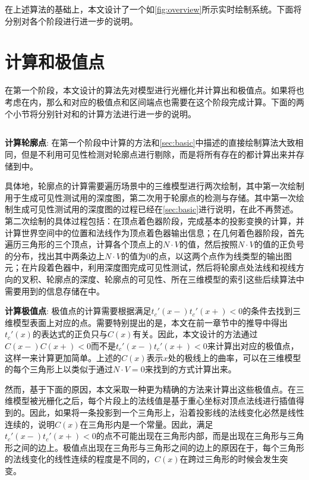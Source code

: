 {在上述算法的基础上，本文设计了一个如\autoref{fig:overview}所示实时绘制系统。下面将分别对各个阶段进行进一步的说明。

\section{计算\conp{}和极值点}

在第一个阶段，本文设计的算法先对模型进行光栅化并计算出\conp{}和极值点。如果将\scon{}也考虑在内，那么\sconp{}和对应的极值点和区间端点也需要在这个阶段完成计算。下面的两个小节将分别针对\con{}和\scon{}的计算方法进行进一步的说明。

\subsection{\con{}}

\textbf{计算轮廓点}: 在第一个阶段中计算\conp{}的方法和\autoref{sec:basic}中描述的直接绘制算法大致相同，但是不利用可见性检测对轮廓点进行剔除，而是将所有存在的\conp{}都计算出来并存储到\ppll{}中。

具体地，轮廓点的计算需要遍历场景中的三维模型进行两次绘制，其中第一次绘制用于生成可见性测试用的深度图，第二次用于轮廓点的检测与存储。其中第一次绘制生成可见性测试用的深度图的过程已经在\autoref{sec:basic}进行说明，在此不再赘述。第二次绘制的具体过程包括：在顶点着色器阶段，完成基本的投影变换的计算，并计算世界空间中的位置和法线作为顶点着色器输出信息；在几何着色器阶段，首先遍历三角形的三个顶点，计算各个顶点上的$N\cdot{V}$的值，然后按照$N\cdot{V}$的值的正负号的分布，找出其中两条边上$N\cdot{V}$的值为0的点，以这两个点作为线类型的输出图元；在片段着色器中，利用深度图完成可见性测试，然后将轮廓点处法线和视线方向的叉积、轮廓点的深度、轮廓点的可见性、所在三维模型的索引这些后续算法中需要用到的信息存储在\ppll{}中。

\textbf{计算极值点}: 极值点的计算需要根据满足$t_c'(x-)t_c'(x+) < 0$的条件去找到三维模型表面上对应的点。需要特别提出的是，本文在前一章节中的推导中得出$t_c'(x)$的表达式的正负只与$C(x)$有关。因此，本文设计的方法通过$C(x-)C(x+) < 0$而不是$t_c'(x-)t_c'(x+) < 0$来计算出\con{}对应的极值点，这样一来计算更加简单。上述的$C(x)$表示$x$处的极线上的曲率，可以在三维模型的每个三角形上以类似于通过$N\cdot{V} = 0$来找到\conp{}的方式计算出来。

然而，基于下面的原因，本文采取一种更为精确的方法来计算出这些极值点。在三维模型被光栅化之后，每个片段上的法线值是基于重心坐标对顶点法线进行插值得到的。因此，如果将一条\ec{}投影到一个三角形上，沿着投影线的法线变化必然是线性连续的，说明$C(x)$在三角形内是一个常量。因此，满足$t_c'(x-)t_c'(x+) < 0$的点不可能出现在三角形内部，而是出现在三角形与三角形之间的边上。极值点出现在三角形与三角形之间的边上的原因在于，每个三角形的法线变化的线性连续的程度是不同的，$C(x)$在跨过三角形的时候会发生突变。

}
